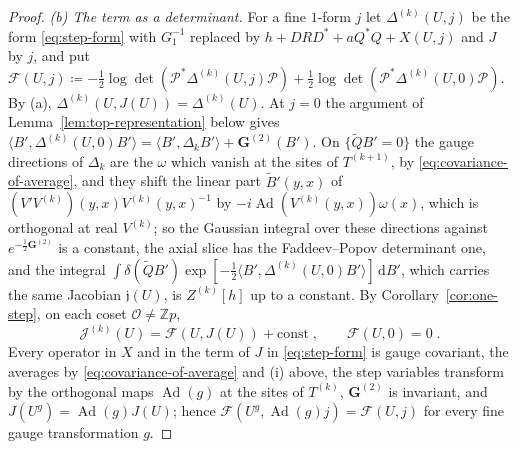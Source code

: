 \documentclass[11pt]{preprint}
\newcommand{\dd}{\mathrm{d}}
\numberwithin{equation}{section}
\theoremstyle{definition}
\theoremstyle{remark}
\theoremstyle{plain}
\begin{document}
\begin{proof}
\emph{(b) The term as a determinant.} For a fine $1$-form $j$ let $\Delta^{(k)}(U, j)$ be the form \eqref{eq:step-form} with $G_1^{-1}$ replaced by $h + DRD^* + aQ^*Q + X(U, j)$ and $J$ by $j$, and put $\mathcal F(U, j) \coloneqq -\frac12\log\det(\mathcal P^*\Delta^{(k)}(U, j)\mathcal P) + \frac12\log\det(\mathcal P^*\Delta^{(k)}(U, 0)\mathcal P)$. By (a), $\Delta^{(k)}(U, J(U)) = \Delta^{(k)}(U)$. At $j = 0$ the argument of Lemma~\ref{lem:top-representation} below gives $\langle B', \Delta^{(k)}(U, 0)B' \rangle = \langle B', \Delta_kB' \rangle + \mathbf G^{(2)}(B')$. On $\{ \tilde QB' = 0 \}$ the gauge directions of $\Delta_k$ are the $\omega$ which vanish at the sites of $T^{(k+1)}$, by \eqref{eq:covariance-of-average}, and they shift the linear part $\tilde B'(y, x)$ of $(V'V^{(k)})(y, x)V^{(k)}(y, x)^{-1}$ \cite[p.~266]{BalabanRG1} by $-i\operatorname{Ad}(V^{(k)}(y, x))\omega(x)$, which is orthogonal at real $V^{(k)}$; so the Gaussian integral over these directions against $e^{-\frac12\mathbf G^{(2)}}$ is a constant, the axial slice has the Faddeev--Popov determinant one, and the integral $\int\delta(\tilde QB')\exp[-\frac12\langle B', \Delta^{(k)}(U, 0)B' \rangle]\,\dd B'$, which carries the same Jacobian $\mathfrak j(U)$, is $Z^{(k)}[h]$ up to a constant. By Corollary~\ref{cor:one-step}, on each coset $\mathcal O \neq \mathbb Zp$,
\begin{equation}\label{eq:current-term-determinant}
    \mathcal J^{(k)}(U) = \mathcal F(U, J(U)) + \mathrm{const}\;,
    \qquad
    \mathcal F(U, 0) = 0\;.
\end{equation}
Every operator in $X$ and in the term of $J$ in \eqref{eq:step-form} is gauge covariant, the averages by \eqref{eq:covariance-of-average} and (i) above, the step variables transform by the orthogonal maps $\operatorname{Ad}(g)$ at the sites of $T^{(k)}$, $\mathbf G^{(2)}$ is invariant, and $J(U^g) = \operatorname{Ad}(g)J(U)$; hence $\mathcal F(U^g, \operatorname{Ad}(g)j) = \mathcal F(U, j)$ for every fine gauge transformation $g$.


\end{proof}
\end{document}
